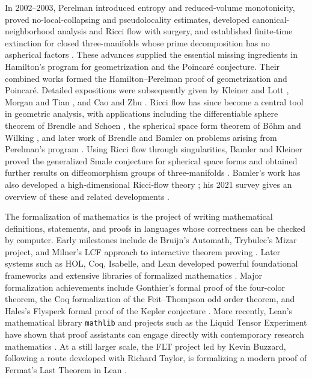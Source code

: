 \documentclass[11pt]{article}
\theoremstyle{plain}
\theoremstyle{definition}
\theoremstyle{remark}
\begin{document}
In 2002--2003, Perelman introduced entropy and reduced-volume
monotonicity, proved no-local-collapsing and pseudolocality estimates,
developed canonical-neighborhood analysis and Ricci flow with surgery, and
established finite-time extinction for closed three-manifolds whose prime
decomposition has no aspherical factors
\cite{Perelman1,Perelman2,Perelman3}.  These advances supplied the essential
missing ingredients in Hamilton's program for geometrization and the
Poincaré conjecture.
Their combined works formed the Hamilton--Perelman proof of geometrization and Poincar\'e.
Detailed expositions were subsequently given by Kleiner and Lott
\cite{MR2460872}, Morgan and Tian \cite{MR2334563,MR3186136}, and Cao and Zhu
\cite{MR2233789}.  Ricci flow has since become a central tool in geometric
analysis, with applications including the differentiable sphere theorem of
Brendle and Schoen \cite{BrendleSchoen}, the spherical space form theorem of
B\"ohm and Wilking \cite{BohmWilking}, and later work of Brendle and Bamler on
problems arising from Perelman's program \cite{Brendle2018U,Bamler0}.
Using Ricci flow through singularities, Bamler and Kleiner proved the
generalized Smale conjecture for spherical space forms and obtained further
results on diffeomorphism groups of three-manifolds
\cite{BamlerKleinerContractibility,BamlerKleinerDiffGroups}.  Bamler's work has
also developed a high-dimensional Ricci-flow theory
\cite{Bamler2020A,MR4623543,Bamler2020C}; his 2021 survey gives an overview of
these and related developments \cite{BamlerNotices2021}.

The formalization of mathematics is the project of writing mathematical
definitions, statements, and proofs in languages whose correctness can be
checked by computer.  Early milestones include de Bruijn's Automath,
Trybulec's Mizar project, and Milner's LCF approach to interactive theorem
proving \cite{deBruijnAutomath,TrybulecMizar,GordonMilnerWadsworthLCF}.
Later systems such as HOL, Coq, Isabelle, and Lean developed powerful
foundational frameworks and extensive libraries of formalized mathematics
\cite{GordonHOL,Coq,PaulsonIsabelle,deMouraLean}.  Major formalization
achievements include Gonthier's formal proof of the four-color theorem, the Coq
formalization of the Feit--Thompson odd order theorem, and Hales's Flyspeck
formal proof of the Kepler conjecture
\cite{GonthierFourColor,GonthierOddOrder,HalesFlyspeck}.  More recently,
Lean's mathematical library \texttt{mathlib} and projects such as the Liquid
Tensor Experiment have shown that proof assistants can engage directly with
contemporary research mathematics \cite{mathlib,CommelinLiquidTensor}.
At a still larger scale, the FLT project led by Kevin Buzzard, following a
route developed with Richard Taylor, is formalizing a modern proof of Fermat's
Last Theorem in Lean \cite{BuzzardTaylorFLT}.
\end{document}
